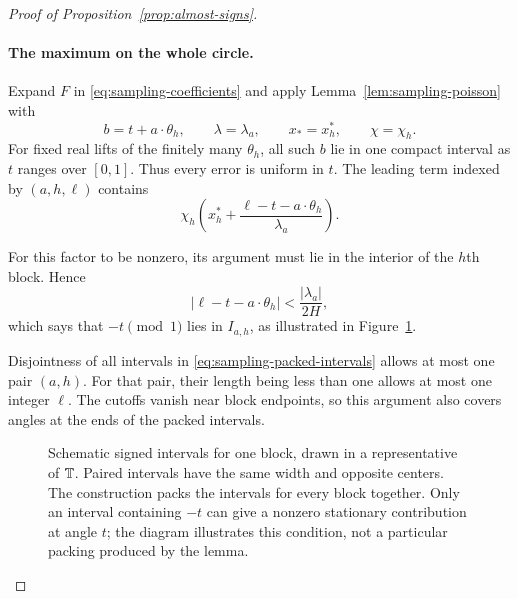\begin{proof}[Proof of Proposition~\ref{prop:almost-signs}]
\paragraph{The maximum on the whole circle.}
Expand $F$ in \eqref{eq:sampling-coefficients} and apply
Lemma~\ref{lem:sampling-poisson} with
\[
 b=t+a\cdot\theta_h,\qquad
 \lambda=\lambda_a,\qquad x_*=x_h^*,\qquad \chi=\chi_h.
\]
For fixed real lifts of the finitely many $\theta_h$, all such $b$ lie in
one compact interval as $t$ ranges over $[0,1]$.  Thus every error is
uniform in $t$.  The leading term indexed by $(a,h,\ell)$ contains
\begin{equation}\label{eq:sampling-stationary-point}
 \chi_h\!\left(x_h^*+\frac{\ell-t-a\cdot\theta_h}{\lambda_a}\right).
\end{equation}
\begin{samepage}
For this factor to be nonzero, its argument must lie in the interior of
the $h$th block.  Hence
\[
 |\ell-t-a\cdot\theta_h|<\frac{|\lambda_a|}{2H},
\]
which says that $-t\pmod1$ lies in $I_{a,h}$, as illustrated in
Figure~\ref{fig:sampling-intervals}.
\end{samepage}

Disjointness of all intervals in \eqref{eq:sampling-packed-intervals}
allows at most one pair $(a,h)$.  For that pair, their length being less
than one allows at most one integer $\ell$.  The cutoffs vanish near block
endpoints, so this argument also covers angles at the ends of the packed
intervals.

\begin{figure}[H]
\centering
{}
\caption{Schematic signed intervals for one block, drawn in a representative
of $\mathbb T$.  Paired intervals have the same width and opposite centers.  The
construction packs the intervals for every block together.  Only an interval
containing $-t$ can give a nonzero stationary contribution at angle $t$;
the diagram illustrates this condition, not a particular packing produced
by the lemma.}
\label{fig:sampling-intervals}
\end{figure}


\end{proof}
